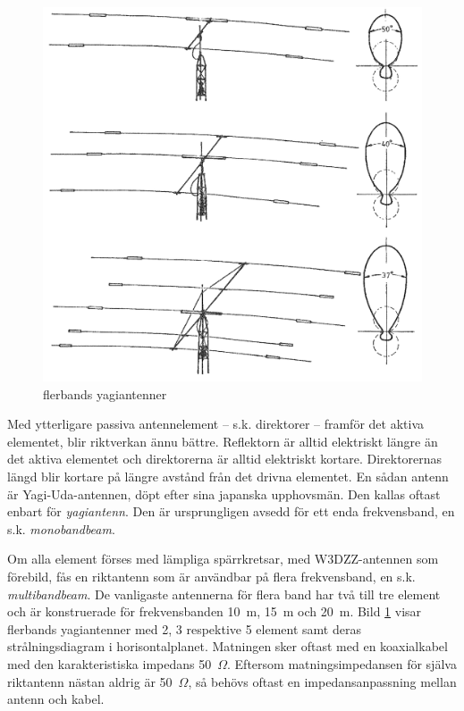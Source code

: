 \begin{figure}
  \includegraphics[width=\textwidth]{images/cropped_pdfs/bild_2_6-18.pdf}
  \caption{flerbands yagiantenner}
  \label{fig:bildII6-18}
\end{figure}

Med ytterligare passiva antennelement -- s.k. direktorer -- framför det
aktiva elementet, blir riktverkan ännu bättre.
Reflektorn är alltid elektriskt längre än det aktiva elementet och direktorerna
är alltid elektriskt kortare.
Direktorernas längd blir kortare på längre avstånd från det drivna elementet.
En sådan antenn är Yagi-Uda-antennen, döpt efter sina japanska upphovsmän.
Den kallas oftast enbart för \emph{yagiantenn}.
Den är ursprungligen avsedd för ett enda frekvensband, en s.k.
\emph{monobandbeam}.

Om alla element förses med lämpliga spärrkretsar, med W3DZZ-antennen som
förebild, fås en riktantenn som är användbar på flera frekvensband, en s.k.
\emph{multibandbeam}.
De vanligaste antennerna för flera band har två till tre element och är
konstruerade för frekvensbanden 10~m, 15~m och 20~m.
Bild \ref{fig:bildII6-18} visar flerbands yagiantenner med 2, 3 respektive 5
element samt deras strålningsdiagram i horisontalplanet.
Matningen sker oftast med en koaxialkabel med den karakteristiska impedans 50~\(\Omega\).
Eftersom matningsimpedansen för själva riktantenn nästan aldrig är
50~\(\Omega\), så behövs oftast en impedansanpassning mellan antenn och kabel.


